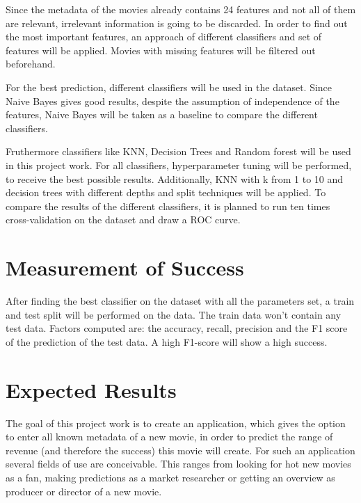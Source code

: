 Since the metadata of the movies already contains 24 features and not all of them are relevant, irrelevant information is going to be discarded. In order to find out the most important features, an approach of different classifiers and set of features will be applied. Movies with missing features will be filtered out beforehand. 

For the best prediction, different classifiers will be used in the dataset. Since Naive Bayes gives good results, despite the assumption of independence of the features, Naive Bayes will be taken as a baseline to compare the different classifiers. 

Fruthermore classifiers like KNN, Decision Trees and Random forest will be used in this project work. For all classifiers, hyperparameter tuning will be performed, to receive the best possible results. Additionally, KNN with k from 1 to 10 and decision trees with different depths and split techniques will be applied.
To compare the results of the different classifiers, it is planned to run ten times cross-validation on the dataset and draw a ROC curve.


\section{Measurement of Success}
After finding the best classifier on the dataset with all the parameters set, a train and test split will be performed on the data. The train data won't contain any test data. Factors computed are: the accuracy, recall, precision and the F1 score of the prediction of the test data. A high F1-score will show a high success.

\section{Expected Results}
The goal of this project work is to create an application, which gives the option to enter all known metadata of a new movie, in order to predict the range of revenue (and therefore the success) this movie will create. For such an application several fields of use are conceivable. This ranges from looking for hot new movies as a fan, making predictions as a market researcher or getting an overview as producer or director of a new movie. 





